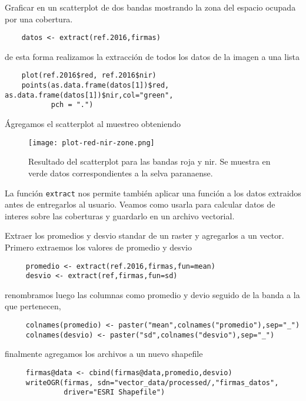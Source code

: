 \begin{exa}
    Graficar en un scatterplot de dos bandas mostrando la zona del espacio
    ocupada por una cobertura.
    \begin{lstlisting}
    datos <- extract(ref.2016,firmas)
    \end{lstlisting}
    de esta forma realizamos la extracci\'on de todos los datos de la imagen a una
    lista
    \begin{lstlisting}
    plot(ref.2016$red, ref.2016$nir)
    points(as.data.frame(datos[1])$red, as.data.frame(datos[1])$nir,col="green",
           pch = ".")
    \end{lstlisting}
    Ágregamos el scatterplot al muestreo obteniendo
    \begin{figure}[h!]
    \begin{center}
        \texttt{[image: plot-red-nir-zone.png]}
    \end{center}
    \caption{Resultado del scatterplot para las bandas roja y nir. Se muestra en
        verde datos correspondientes a la selva paranaense.}
    \label{fig:rednirzone}
    \end{figure}

\end{exa}

La funci\'on \texttt{extract} nos permite tambi\'en aplicar una funci\'on a los datos
extraidos antes de entregarlos al usuario. Veamos como usarla para calcular
datos de interes sobre las coberturas y guardarlo en un archivo vectorial.

\begin{exa}
     Extraer los promedios y desvio standar de un raster y agregarlos a un
     vector. Primero extraemos los valores de promedio y desvio
     \begin{lstlisting}
     promedio <- extract(ref.2016,firmas,fun=mean)
     desvio <- extract(ref,firmas,fun=sd)
     \end{lstlisting}
     renombramos luego las columnas como promedio y devio seguido de la banda a
     la que pertenecen,
     \begin{lstlisting}
     colnames(promedio) <- paster("mean",colnames("promedio"),sep="_")
     colnames(desvio) <- paster("sd",colnames("desvio"),sep="_")
     \end{lstlisting}
     finalmente agregamos los archivos a un nuevo shapefile
     \begin{lstlisting}
     firmas@data <- cbind(firmas@data,promedio,desvio)
     writeOGR(firmas, sdn="vector_data/processed/,"firmas_datos",
              driver="ESRI Shapefile")
     \end{lstlisting}
\end{exa}

